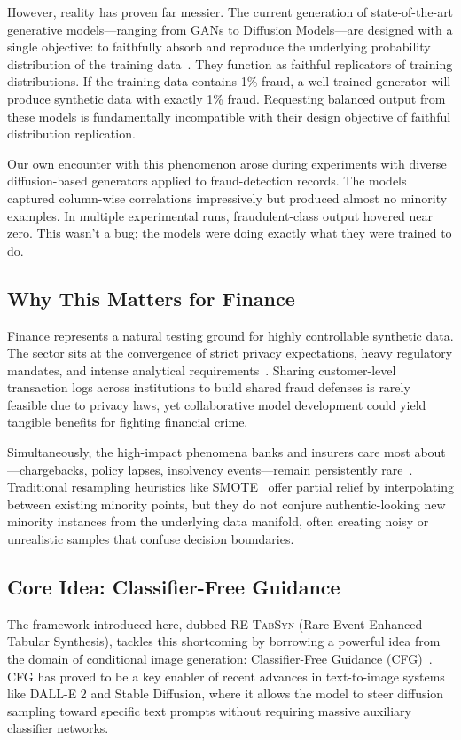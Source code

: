 \documentclass[conference]{IEEEtran}
\newcommand{\retabsyn}{\textsc{RE-TabSyn}}
\begin{document}
However, reality has proven far messier. The current generation of state-of-the-art generative models—ranging from GANs to Diffusion Models—are designed with a single objective: to faithfully absorb and reproduce the underlying probability distribution of the training data~\cite{jordon2022fake}. They function as faithful replicators of training distributions. If the training data contains 1\% fraud, a well-trained generator will produce synthetic data with exactly 1\% fraud. Requesting balanced output from these models is fundamentally incompatible with their design objective of faithful distribution replication.

Our own encounter with this phenomenon arose during experiments with diverse diffusion-based generators applied to fraud-detection records. The models captured column-wise correlations impressively but produced almost no minority examples. In multiple experimental runs, fraudulent-class output hovered near zero. This wasn't a bug; the models were doing exactly what they were trained to do.

\subsection{Why This Matters for Finance}
Finance represents a natural testing ground for highly controllable synthetic data. The sector sits at the convergence of strict privacy expectations, heavy regulatory mandates, and intense analytical requirements~\cite{assefa2020synthetic, sattarov2023findiff}. Sharing customer-level transaction logs across institutions to build shared fraud defenses is rarely feasible due to privacy laws, yet collaborative model development could yield tangible benefits for fighting financial crime.

Simultaneously, the high-impact phenomena banks and insurers care most about—chargebacks, policy lapses, insolvency events—remain persistently rare~\cite{fiore2019hybrid, nidhi2024rare}. Traditional resampling heuristics like SMOTE~\cite{chawla2002smote} offer partial relief by interpolating between existing minority points, but they do not conjure authentic-looking new minority instances from the underlying data manifold, often creating noisy or unrealistic samples that confuse decision boundaries.

\subsection{Core Idea: Classifier-Free Guidance}
The framework introduced here, dubbed \retabsyn{} (Rare-Event Enhanced Tabular Synthesis), tackles this shortcoming by borrowing a powerful idea from the domain of conditional image generation: Classifier-Free Guidance (CFG)~\cite{ho2022cfg}. CFG has proved to be a key enabler of recent advances in text-to-image systems like DALL-E 2 and Stable Diffusion, where it allows the model to steer diffusion sampling toward specific text prompts without requiring massive auxiliary classifier networks.
\end{document}
